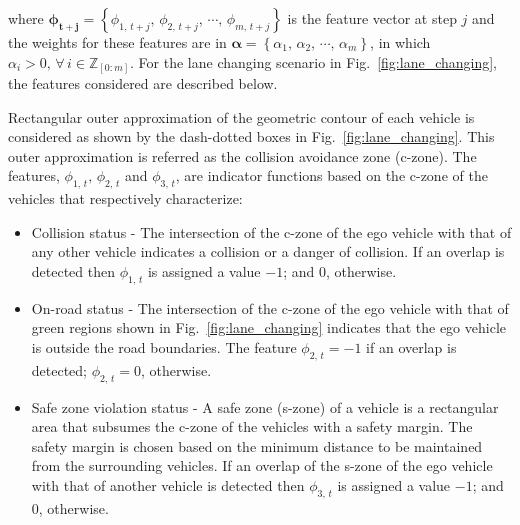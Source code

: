 \documentclass[10pt,journal]{IEEEtran}
\begin{document}
	\noindent where $\boldsymbol{{\phi}_{t+j}} = \left\{\phi_{1,\,{t+j}},\,\phi_{2,\,{t+j}},\,\cdots,\,\phi_{m,\,{t+j}}\right\}$ is the feature vector at step $j$ and the weights for these features are in  $\boldsymbol{{\alpha}} = \left\{\alpha_{1},\,\alpha_{2},\,\cdots,\,\alpha_{m}\right\}$, in which $\alpha_{i}>0,\,\forall \, i\in \mathbb{Z}_{\left[0:m\right]}$. For the lane changing scenario in  Fig.~\ref{fig:lane_changing}, the  features considered are described below. 
	
	Rectangular outer approximation of the geometric contour of each vehicle is considered as shown by the dash-dotted boxes in Fig.~\ref{fig:lane_changing}. This outer approximation is referred as the collision avoidance zone (c-zone). The features, $\phi_{1,\,{t}},\,\phi_{2,\,{t}}$ and $\phi_{3,\,{t}}$, are indicator functions based on the c-zone of the vehicles that respectively characterize:
	\begin{itemize}
		\item Collision status - The intersection of the c-zone of the ego vehicle with that of any other vehicle indicates a collision or a danger of collision. If an overlap is detected then $\phi_{1,\,{t}}$ is assigned a value $-1$; and $0$, otherwise.
		
		\item On-road status - The intersection of the c-zone of the ego vehicle with that of green regions shown in Fig.~\ref{fig:lane_changing} indicates that the ego vehicle is outside the road boundaries. The feature $\phi_{2,\,{t}} = -1$ if an overlap is detected; $\phi_{2,\,{t}} = 0$, otherwise.
		
		\item Safe zone violation status - A safe zone (s-zone) of a vehicle is a rectangular area that subsumes the c-zone of the vehicles with a safety margin. The safety margin is chosen based on the minimum distance to be maintained from the surrounding vehicles. If an overlap of the s-zone of the ego vehicle with that of another vehicle is detected then $\phi_{3,\,{t}}$ is assigned a value $-1$; and $0$, otherwise.		
		
		
	\end{itemize}
	 
\end{document}
